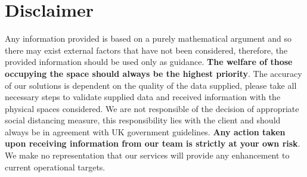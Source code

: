 \documentclass[12pt]{article}
\numberwithin{equation}{section}
\begin{document}
\section*{Disclaimer}
Any information provided is based on a purely mathematical argument and so there may exist external factors that have not been considered, therefore, the provided information should be used only as guidance. \textbf{The welfare of those occupying the space should always be the highest priority}. The accuracy of our solutions is dependent on the quality of the data supplied, please take all necessary steps to validate supplied data and received information with the physical spaces considered. We are not responsible of the decision of appropriate social distancing measure, this responsibility lies with the client and should always be in agreement with UK government guidelines. \textbf{Any action taken upon receiving information from our team is strictly at your own risk}. We make no representation that our services will provide any enhancement to current operational targets. 
\end{document}

